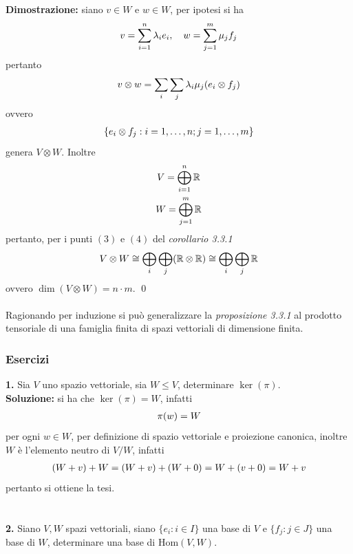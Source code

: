 \documentclass{article}
\begin{document}
\textbf{Dimostrazione:} siano $v \in W$ e $w \in W$, per ipotesi si ha
\begin{gather}
    v = \sum_{i = 1}^n \lambda_i e_i, \quad w = \sum_{j = 1}^m \mu_j f_j \notag
\end{gather}
pertanto
\begin{gather}
    v \otimes w = \sum_i \sum_j \lambda_i \mu_j  (e_i \otimes f_j) \notag
\end{gather}
ovvero
\begin{gather}
    \{ e_i \otimes f_j : i = 1, \dots, n; j = 1, \dots, m \} \notag
\end{gather}
genera $V \otimes W$. Inoltre
\begin{gather}
    V = \bigoplus_{i = 1}^n \mathbb{R} \notag \\
    W = \bigoplus_{j = 1}^m \mathbb{R} \notag
\end{gather}
pertanto, per i punti $(3)$ e $(4)$ del \textit{corollario 3.3.1}
\begin{gather}
    V \otimes W \cong \bigoplus_i \bigoplus_j (\mathbb{R} \otimes \mathbb{R}) \cong \bigoplus_i \bigoplus_j \mathbb{R} \notag
\end{gather}
ovvero $\dim (V \otimes W) = n \cdot m$. \qed \\ \\
Ragionando per induzione si può generalizzare la \textit{proposizione 3.3.1} al prodotto tensoriale di una famiglia finita di spazi vettoriali di dimensione finita.

\subsubsection{Esercizi}
\textbf{1.} Sia $V$ uno spazio vettoriale, sia $W \leq V$, determinare $\ker (\pi)$. \\

\textbf{Soluzione:} si ha che $\ker (\pi) = W$, infatti
\begin{gather}
    \pi(w) = W \notag
\end{gather}
per ogni $w \in W$, per definizione di spazio vettoriale e proiezione canonica, inoltre $W$ è l'elemento neutro di $V/W$, infatti
\begin{gather}
    (W + v) + W = (W + v) + (W + 0) = W + (v + 0) = W + v \notag
\end{gather}
pertanto si ottiene la tesi. \\ \\ \\
\textbf{2.} Siano $V, W$ spazi vettoriali, siano $\{ e_i : i \in I \}$ una base di $V$ e $\{ f_j : j \in J \}$ una base di $W$, determinare una base di $\mathrm{Hom} (V, W)$. \\
\end{document}
